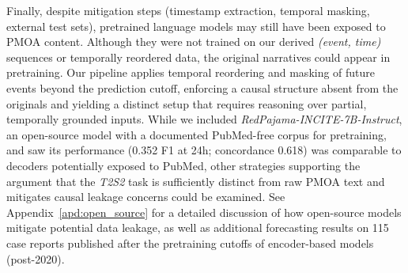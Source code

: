 \documentclass[letterpaper]{article} %
\begin{document}
Finally, despite mitigation steps (timestamp extraction, temporal masking, external test sets), pretrained language models may still have been exposed to PMOA content. Although they were not trained on our derived \emph{(event, time)} sequences or temporally reordered data, the original narratives could appear in pretraining. Our pipeline applies temporal reordering and masking of future events beyond the prediction cutoff, enforcing a causal structure absent from the originals and yielding a distinct setup that requires reasoning over partial, temporally grounded inputs. 
While we included \textit{RedPajama-INCITE-7B-Instruct}, an open-source model with a documented PubMed-free corpus for pretraining, and saw its performance (0.352 F1 at 24h; concordance 0.618) was comparable to decoders potentially exposed to PubMed, other strategies supporting the argument that the \textit{T2S2} task is sufficiently distinct from raw PMOA text and mitigates causal leakage concerns could be examined.
See Appendix~\ref{apd:open_source} for a detailed discussion of how open-source models mitigate potential data leakage, as well as additional forecasting results on 115 case reports published after the pretraining cutoffs of encoder-based models (post-2020).


\end{document}
